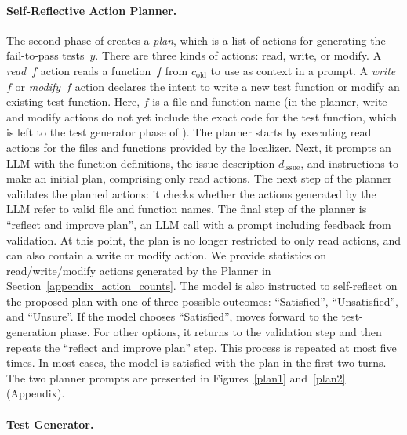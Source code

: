 \paragraph{Self-Reflective Action Planner.}

The second phase of \solx creates a \emph{plan}, which is a list of
actions for generating the fail-to-pass tests~$y$.
There are three kinds of actions: read, write, or modify.
A \emph{read}~$f$ action reads a function~$f$ from $c_\mathrm{old}$ to
use as context in a prompt.
A \emph{write}~$f$ or \emph{modify}~$f$ action declares the intent
to write a new test function or modify an existing test function.
Here, $f$ is a file and function name (in the planner, write and
modify actions do not yet include the exact code for the test
function, which is left to the test generator phase of \solx).
The planner starts by executing read actions for the
files and functions provided by the localizer.
Next, it prompts an LLM with the function definitions, the issue
description $d_\mathrm{issue}$, and instructions to make an initial
plan, comprising only read actions.
The next step of the planner validates the planned actions: it checks
whether the actions generated by the LLM refer to valid file and
function names.
The final step of the planner is ``reflect and improve plan'', an LLM
call with a prompt including feedback from validation.
At this point, the plan is no longer restricted to only read actions,
and can also contain a write or modify action. We provide statistics on read/write/modify actions generated by the Planner in Section~\ref{appendix_action_counts}.
The model is also instructed to self-reflect on the proposed plan with
one of three possible outcomes: ``Satisfied'', ``Unsatisfied'', and
``Unsure''.
If the model chooses ``Satisfied'', \solx moves forward to the
test-generation phase.
For other options, it returns to the validation step and then repeats
the ``reflect and improve plan'' step.
This process is repeated at most five times.
In most cases, the model is satisfied with the plan in the first two
turns.
The two planner prompts are presented in Figures~\ref{plan1} and~\ref{plan2} (Appendix).

\paragraph{Test Generator.}

